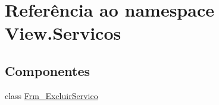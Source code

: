 \hypertarget{namespace_view_1_1_servicos}{}\section{Referência ao namespace View.\+Servicos}
\label{namespace_view_1_1_servicos}
\subsection*{Componentes}
\begin{DoxyCompactItemize}
\item 
class \hyperlink{class_view_1_1_servicos_1_1_frm___excluir_servico}{Frm\+\_\+\+Excluir\+Servico}
\end{DoxyCompactItemize}

